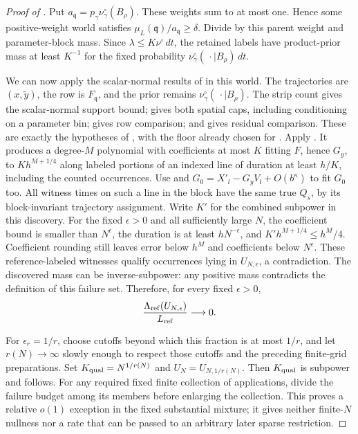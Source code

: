 \begin{proof}[Proof of ]
Put \(a_{\mathfrak q}=p_\gamma\nu^\circ_\gamma(B_\rho)\).
These weights sum to at most one. Hence some positive-weight world
satisfies \(\mu_L(\mathfrak q)/a_{\mathfrak q}\geq\delta\).
Divide by this parent weight and parameter-block mass. Since
\(\lambda\leq K\nu^\circ\,dt\), the retained labels have
product-prior mass at least \(K^{-1}\) for the fixed probability
\(\nu^\circ_\gamma(\,\cdot\mid B_\rho)\,dt\).

We can now apply the scalar-normal results of 
in this world. The trajectories are \((x,\widetilde y)\), the row is
\(F_{\mathfrak q}\), and the prior remains
\(\nu^\circ_\gamma(\,\cdot\mid B_\rho)\). The strip count gives
the scalar-normal support bound; 
gives both spatial caps, including conditioning on a parameter bin;
 gives row comparison; and
 gives residual comparison.
These are exactly the hypotheses of ,
with the floor already chosen for .
Apply . It produces a
degree-\(M\) polynomial with coefficients at most \(K\) fitting \(F\),
hence \(G_y\), to \(Kh^{M+1/4}\) along labeled portions of an indexed
line of duration at least \(h/K\), including the counted occurrences.
Use  and
\(G_0=X'_l-G_yV_l+O(b^\kappa)\) to fit \(G_0\) too.
All witness times on such a line in the block have the same true
\(Q_s\), by its block-invariant trajectory assignment.
Write \(K'\) for the combined subpower in this discovery.
For the fixed \(\epsilon>0\) and all sufficiently large \(N\),
the coefficient bound is smaller than \(N^\epsilon\), the
duration is at least \(hN^{-\epsilon}\), and
\(K'h^{M+1/4}\leq h^M/4\). Coefficient rounding still leaves
error below \(h^M\) and coefficients below \(N^\epsilon\).
These reference-labeled witnesses qualify occurrences lying in
\(U_{N,\epsilon}\), a contradiction. The discovered mass can be
inverse-subpower: any positive mass contradicts the definition
of this failure set. Therefore, for every fixed \(\epsilon>0\),
\[
 \frac{\Lambda_{\rm ref}(U_{N,\epsilon})}{L_{\rm ref}}
       \longrightarrow0.
\]

For \(\epsilon_r=1/r\), choose cutoffs beyond which this fraction
is at most \(1/r\), and let \(r(N)\to\infty\) slowly enough to
respect those cutoffs and the preceding finite-grid preparations.
Set \(K_{\rm qual}=N^{1/r(N)}\) and
\(U_N=U_{N,1/r(N)}\). Then \(K_{\rm qual}\) is subpower and
 follows. For any required fixed
finite collection of applications, divide the failure budget
among its members before enlarging the collection. This proves a
relative \(o(1)\) exception in the fixed substantial mixture;
it gives neither finite-\(N\) nullness nor a rate that can be
passed to an arbitrary later sparse restriction.
\end{proof}


